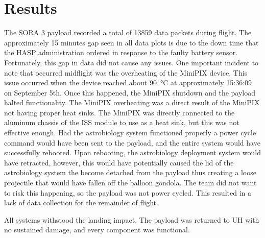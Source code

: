 \section{Results}
\label{sec:Results}

The SORA 3 payload recorded a total of 13859 data packets during flight.
The approximately 15 minutes gap seen in all data plots is due to the down time that the HASP administration ordered in response to the faulty battery sensor.
Fortunately, this gap in data did not cause any issues.
One important incident to note that occurred midflight was the overheating of the MiniPIX device.
This issue occurred when the device reached about \SI{90}{\celsius} at approximately 15:36:09 on September 5th.
Once this happened, the MiniPIX shutdown and the payload halted functionality.
The MiniPIX overheating was a direct result of the MiniPIX not having proper heat sinks.
The MiniPIX was directly connected to the aluminum chassis of the ISS module to use as a heat sink, but this was not effective enough.
Had the astrobiology system functioned properly a power cycle command would have been sent to the payload, and the entire system would have successfully rebooted.
Upon rebooting, the astrobiology deployment system would have retracted, however, this would have potentially caused the lid of the astrobiology system the become detached from the payload thus creating a loose projectile that would have fallen off the balloon gondola.
The team did not want to risk this happening, so the payload was not power cycled.
This resulted in a lack of data collection for the remainder of flight.

All systems withstood the landing impact.
The payload was returned to UH with no sustained damage, and every component was functional.
